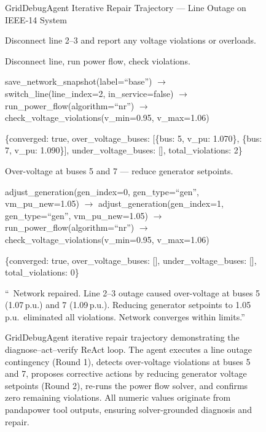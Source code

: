 \begin{figure}[ht]
\centering
\begin{minipage}{0.94\linewidth}
\begin{promptfigure}{GridDebugAgent Iterative Repair Trajectory --- Line Outage on IEEE-14 System}
\footnotesize
{\ttfamily\small
{} Disconnect line 2--3 and report any voltage violations or overloads.\vspace{1mm}\par
{} Disconnect line, run power flow, check violations.\vspace{1mm}\par
{} save\_network\_snapshot(label=``base'') $\to$ switch\_line(line\_index=2, in\_service=false) $\to$ run\_power\_flow(algorithm=``nr'') $\to$ check\_voltage\_violations(v\_min=0.95, v\_max=1.06)\vspace{1mm}\par
{} \{converged: true, over\_voltage\_buses: [\{bus: 5, v\_pu: 1.070\}, \{bus: 7, v\_pu: 1.090\}], under\_voltage\_buses: [], total\_violations: 2\}\vspace{1mm}\par
{} Over-voltage at buses 5 and 7 --- reduce generator setpoints.\vspace{1mm}\par
{} adjust\_generation(gen\_index=0, gen\_type=``gen'', vm\_pu\_new=1.05) $\to$ adjust\_generation(gen\_index=1, gen\_type=``gen'', vm\_pu\_new=1.05) $\to$ run\_power\_flow(algorithm=``nr'') $\to$ check\_voltage\_violations(v\_min=0.95, v\_max=1.06)\vspace{1mm}\par
{} \{converged: true, over\_voltage\_buses: [], under\_voltage\_buses: [], total\_violations: 0\}\vspace{1mm}\par
{} ``\goodmark\ Network repaired. Line 2--3 outage caused over-voltage at buses 5 (1.07\,p.u.) and 7 (1.09\,p.u.). Reducing generator setpoints to 1.05\,p.u.\ eliminated all violations. Network converges within limits.''
}
\end{promptfigure}
\end{minipage}
\caption{GridDebugAgent iterative repair trajectory demonstrating the diagnose--act--verify ReAct loop. The agent executes a line outage contingency (Round 1), detects over-voltage violations at buses 5 and 7, proposes corrective actions by reducing generator voltage setpoints (Round 2), re-runs the power flow solver, and confirms zero remaining violations. All numeric values originate from pandapower tool outputs, ensuring solver-grounded diagnosis and repair.}
\label{fig:griddebug_trajectory}
\end{figure}
